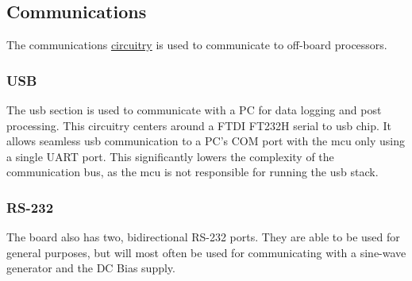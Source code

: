 \subsection{Communications}

The communications \hyperlink{sch:com}{circuitry} is used to communicate to off-board processors.

\subsubsection{USB}
The \gls{usb} section is used to communicate with a PC for data logging and post processing. This circuitry centers around a FTDI FT232H serial to \gls{usb} chip. It allows seamless \gls{usb} communication to a PC's COM port with the \gls{mcu} only using a single UART port. This significantly lowers the complexity of the communication bus, as the \gls{mcu} is not responsible for running the \gls{usb} stack.

\subsubsection{RS-232}
The board also has two, bidirectional RS-232 ports. They are able to be used for general purposes, but will most often be used for communicating with a sine-wave generator and the DC Bias supply.

